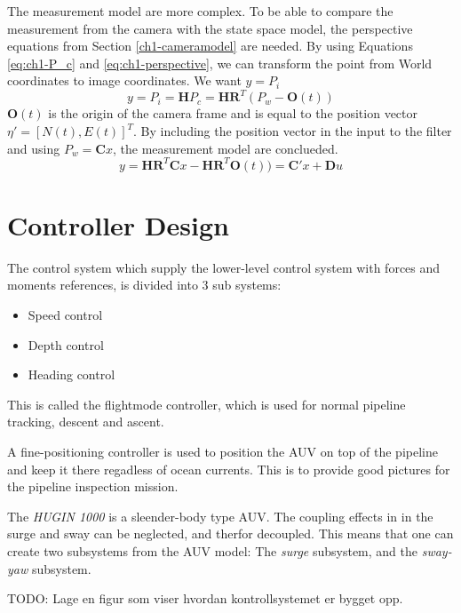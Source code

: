 	The measurement model are more complex. To be able to compare the measurement from the camera with the
	state space model, the perspective equations from Section \ref{ch1-cameramodel} are needed. By using
	Equations \eqref{eq:ch1-P_c} and \eqref{eq:ch1-perspective}, we can transform the point from World
	coordinates to image coordinates. We want $y = P_i$
	\begin{equation*}
		y = P_i = \mathbf{H} P_c = \mathbf{H R}^T ( P_w - \mathbf{O}(t))
	\end{equation*}
	$\mathbf{O}(t)$ is the origin of the camera frame and is equal to the position vector $\eta' = [N(t),
	E(t)]^T$. By including the position vector in the input to the filter and using 
	$P_w = \mathbf{C} x$, the measurement model are conclueded.
	\begin{equation}
		\label{eq:ch2-measurement}
		y = \mathbf{H R}^T \mathbf{C} x - \mathbf{H R}^T  \mathbf{O}(t)) = \mathbf{C}'x + \mathbf{D} u
	\end{equation}





	
\section{Controller Design}
	The control system which supply the lower-level control system with forces and moments references, is 
	divided into 3 sub systems:
		\begin{itemize}
		 \item Speed control
		 \item Depth control
		 \item Heading control
		\end{itemize}
	This is called the flightmode controller, which is used for normal pipeline tracking, descent and ascent. 
	
	A fine-positioning controller is used to position the AUV on top of the pipeline and keep it there regadless 
	of ocean currents. This is to provide good pictures for the pipeline inspection mission.
	
	The \textit{HUGIN 1000} is a sleender-body type AUV. The coupling effects in in the surge and sway can be 
	neglected, and therfor decoupled. This means that one can create two subsystems from the AUV model: 
	The \textit{surge} subsystem, and the \textit{sway-yaw} subsystem. 
	
	TODO: Lage en figur som viser hvordan kontrollsystemet er bygget opp.
	
